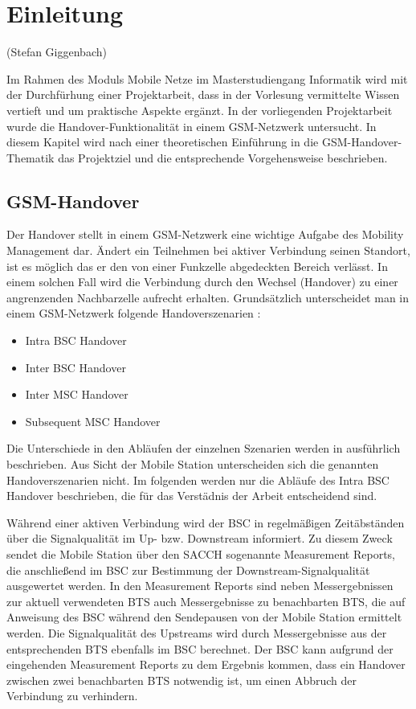 \section{Einleitung}
(Stefan Giggenbach)

Im Rahmen des Moduls Mobile Netze im Masterstudiengang Informatik wird mit der Durchfürhung einer Projektarbeit, dass in der Vorlesung vermittelte Wissen vertieft und um praktische Aspekte ergänzt. In der vorliegenden Projektarbeit wurde die Handover-Funktionalität in einem GSM-Netzwerk untersucht. In diesem Kapitel wird nach einer theoretischen Einführung in die GSM-Handover-Thematik das Projektziel und die entsprechende Vorgehensweise beschrieben.

\subsection{GSM-Handover}\label{sec:handover}

Der Handover stellt in einem GSM-Netzwerk eine wichtige Aufgabe des Mobility Management dar. Ändert ein Teilnehmen bei aktiver Verbindung seinen Standort, ist es möglich das er den von einer Funkzelle abgedeckten Bereich verlässt. In einem solchen Fall wird die Verbindung durch den Wechsel (Handover) zu einer angrenzenden Nachbarzelle aufrecht erhalten. Grundsätzlich unterscheidet man in einem GSM-Netzwerk folgende Handoverszenarien \cite{bib:grundkursmks}:

\begin{itemize}
 \item Intra BSC Handover
 \item Inter BSC Handover
 \item Inter MSC Handover
 \item Subsequent MSC Handover
\end{itemize}

Die Unterschiede in den Abläufen der einzelnen Szenarien werden in \cite{bib:grundkursmks} ausführlich beschrieben. Aus Sicht der Mobile Station unterscheiden sich die genannten Handoverszenarien nicht. Im folgenden werden nur die Abläufe des Intra BSC Handover beschrieben, die für das Verstädnis der Arbeit entscheidend sind.

Während einer aktiven Verbindung wird der BSC in regelmäßigen Zeitäbständen über die Signalqualität im Up- bzw. Downstream informiert. Zu diesem Zweck sendet die Mobile Station über den SACCH sogenannte Measurement Reports, die anschließend im BSC zur Bestimmung der Downstream-Signalqualität ausgewertet werden. In den Measurement Reports sind neben Messergebnissen zur aktuell verwendeten BTS auch Messergebnisse zu benachbarten BTS, die auf Anweisung des BSC während den Sendepausen von der Mobile Station ermittelt werden. Die Signalqualität des Upstreams wird durch Messergebnisse aus der entsprechenden BTS ebenfalls im BSC berechnet. Der BSC kann aufgrund der eingehenden Measurement Reports zu dem Ergebnis kommen, dass ein Handover zwischen zwei benachbarten BTS notwendig ist, um einen Abbruch der Verbindung zu verhindern.

